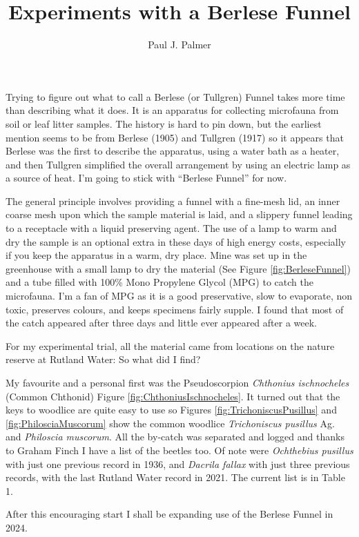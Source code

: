 \documentclass[
]{article}
\title{Experiments with a Berlese Funnel}
\author{Paul J. Palmer}
\date{}
\begin{document}
\maketitle

Trying to figure out what to call a Berlese (or Tullgren) Funnel takes more time than describing what it does. It is an apparatus for collecting microfauna from soil or leaf litter samples. The history is hard to pin down, but the earliest mention seems to be from Berlese (1905) and Tullgren (1917) so it appears that Berlese was the first to describe the apparatus, using a water bath as a heater, and then Tullgren simplified the overall arrangement by using an electric lamp as a source of heat. I'm going to stick with ``Berlese Funnel'' for now.

The general principle involves providing a funnel with a fine-mesh lid, an inner coarse mesh upon which the sample material is laid, and a slippery funnel leading to a receptacle with a liquid preserving agent. The use of a lamp to warm and dry the sample is an optional extra in these days of high energy costs, especially if you keep the apparatus in a warm, dry place. Mine was set up in the greenhouse with a small lamp to dry the material (See Figure \ref{fig:BerleseFunnel}) and a tube filled with 100\% Mono Propylene Glycol (MPG) to catch the microfauna. I'm a fan of MPG as it is a good preservative, slow to evaporate, non toxic, preserves colours, and keeps specimens fairly supple. I found that most of the catch appeared after three days and little ever appeared after a week.

For my experimental trial, all the material came from locations on the nature reserve at Rutland Water: So what did I find?

My favourite and a personal first was the Pseudoscorpion \emph{Chthonius ischnocheles} (Common Chthonid) Figure \ref{fig:ChthoniusIschnocheles}. It turned out that the keys to woodlice are quite easy to use so Figures \ref{fig:TrichoniscusPusillus} and \ref{fig:PhilosciaMuscorum} show the common woodlice \textit{Trichoniscus pusillus} Ag. and \textit{Philoscia muscorum}. All the by-catch was separated and logged and thanks to Graham Finch I have a list of the beetles too. Of note were \emph{Ochthebius pusillus} with just one previous record in 1936, and \emph{Dacrila fallax} with just three previous records, with the last Rutland Water record in 2021. The current list is in Table 1.

After this encouraging start I shall be expanding use of the Berlese Funnel in 2024.
\end{document}
